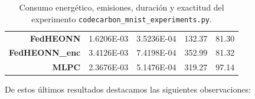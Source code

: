 \documentclass[00-Trabajo_Final.tex]{subfiles}
\begin{document}
\begin{table}[H]
{\begin{tabular}{@{}rrrcc@{}}
\textbf{FedHEONN}               & 1.6206E-03                     & 3.5236E-04                     & 132.37               & 81.30                \\
\textbf{FedHEONN\_enc}           & 3.4126E-03                     & 7.4198E-04                     & 352.99               & 81.32                \\
\textbf{MLPC}                  & 2.3676E-03                     & 5.1476E-04                     & 319.27               & 97.14                \\ \bottomrule
\end{tabular}
}
\caption[Consumo energético en experimento \texttt{codecarbon\_mnist\_experiments.py}]{Consumo energético, emisiones, duración y exactitud del experimento \texttt{codecarbon\_mnist\_experiments.py}.}
\label{tab:resultados_ccmnist_exp}
\end{table}

De estos últimos resultados destacamos las siguientes observaciones:
\end{document}
